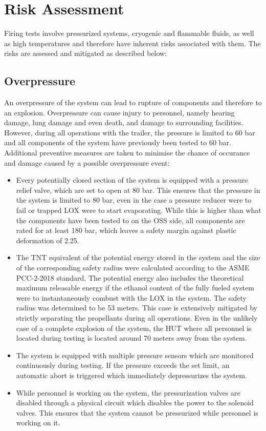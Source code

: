 \documentclass{article}
\begin{document}
\newpage

\section{Risk Assessment}
Firing tests involve pressurized systems, cryogenic and flammable fluids, as well as high temperatures and therefore have inherent risks associated with them. The risks are assessed and mitigated as described below:
\subsection{Overpressure}
An overpressure of the system can lead to rupture of components and therefore to an explosion. Overpressure can cause injury to personnel, namely hearing damage, lung damage and even death, and damage to surrounding facilities. However, during all operations with the trailer, the pressure is limited to 60 bar and all components of the system have previously been tested to 60 bar. Additional preventive measures are taken to minimise the chance of occurance and damage caused by a possible overpressure event:
\begin{itemize}
    \item Every potentially closed section of the system is equipped with a pressure relief valve, which are set to open at 80 bar. This ensures that the pressure in the system is limited to 80 bar, even in the case a pressure reducer were to fail or trapped LOX were to start evaporating. While this is higher than what the components have been tested to on the OSS side, all components are rated for at least 180 bar, which leaves a safety margin against plastic deformation of 2.25.
    \item The TNT equivalent of the potential energy stored in the system and the size of the corresponding safety radius were calculated according to the ASME PCC-2-2018 standard. The potential energy also includes the theoretical maximum releasable energy if the ethanol content of the fully fueled system were to instantaneously combust with the LOX in the system. The safety radius was determined to be 53 meters. This case is extensively mitigated by strictly separating the propellants during all operations. Even in the unlikely case of a complete explosion of the system, the HUT where all personnel is located during testing is located around 70 meters away from the system.
    \item The system is equipped with multiple pressure sensors which are monitored continuously during testing. If the pressure exceeds the set limit, an automatic abort is triggered which immediately depressurizes the system.
    \item While personnel is working on the system, the pressurization valves are disabled through a physical circuit which disables the power to the solenoid valves. This ensures that the system cannot be pressurized while personnel is working on it.
\end{itemize}
\end{document}
